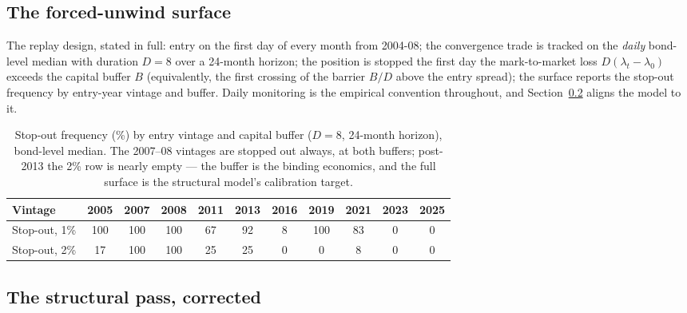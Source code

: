 \documentclass[11pt]{article}
\begin{document}
\subsection{The forced-unwind surface}\label{sec:unwind}

The replay design, stated in full: entry on the first day of every month from 2004-08; the convergence trade is tracked on the \emph{daily} bond-level median with duration $D=8$ over a 24-month horizon; the position is stopped the first day the mark-to-market loss $D(\lambda_t-\lambda_0)$ exceeds the capital buffer $B$ (equivalently, the first crossing of the barrier $B/D$ above the entry spread); the surface reports the stop-out frequency by entry-year vintage and buffer. Daily monitoring is the empirical convention throughout, and Section~\ref{sec:struct} aligns the model to it.

\begin{table}[h!]
\centering\small
\begin{tabular}{lcccccccccc}
\toprule
Vintage & 2005 & 2007 & 2008 & 2011 & 2013 & 2016 & 2019 & 2021 & 2023 & 2025 \\
\midrule
Stop-out, 1\% & 100 & 100 & 100 & 67 & 92 & 8 & 100 & 83 & 0 & 0 \\
Stop-out, 2\% & 17 & 100 & 100 & 25 & 25 & 0 & 0 & 8 & 0 & 0 \\
\bottomrule
\end{tabular}
\caption{Stop-out frequency (\%) by entry vintage and capital buffer ($D=8$, 24-month horizon), bond-level median. The 2007--08 vintages are stopped out always, at both buffers; post-2013 the 2\% row is nearly empty --- the buffer is the binding economics, and the full surface is the structural model's calibration target.}
\end{table}

\subsection{The structural pass, corrected}\label{sec:struct}
\end{document}
